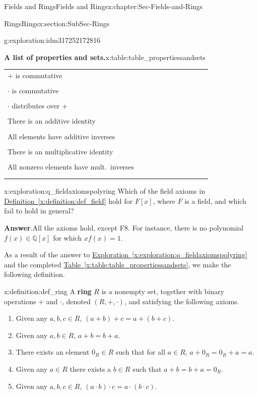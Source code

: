 \documentclass[oneside,10pt,]{book}
\newcommand{\blocktitlefont}{\relax}
\newcommand{\xreffont}{\relax}
\newcommand{\terminology}[1]{\textbf{#1}}
\numberwithin{equation}{section}
\newcommand{\hrulethin}  {\noalign{\hrule height 0.04em}}
\def\Q{{\mathbb Q}}
\begin{document}
\begin{chapterptx}{Fields and Rings}{}{Fields and Rings}{}{}{x:chapter:Sec-Fields-and-Rings}
\begin{sectionptx}{Rings}{}{Rings}{}{}{x:section:SubSec-Rings}
\begin{exploration}{}{g:exploration:idm317252172816}
\begin{tableptx}{\textbf{A list of properties and sets.}}{x:table:table_propertiessandsets}{}
{\begin{tabular}{lllllllllll}
+ is commutative&&&&&&&&&&\tabularnewline[0pt]
&&&&&&&&&&\tabularnewline\hrulethin
\(\cdot\) is commutative&&&&&&&&&&\tabularnewline[0pt]
&&&&&&&&&&\tabularnewline\hrulethin
\(\cdot\) distributes over +&&&&&&&&&&\tabularnewline[0pt]
&&&&&&&&&&\tabularnewline\hrulethin
There is an additive identity&&&&&&&&&&\tabularnewline[0pt]
&&&&&&&&&&\tabularnewline\hrulethin
All elements have additive inverses&&&&&&&&&&\tabularnewline[0pt]
&&&&&&&&&&\tabularnewline\hrulethin
There is an multiplicative identity&&&&&&&&&&\tabularnewline[0pt]
&&&&&&&&&&\tabularnewline\hrulethin
All nonzero elements have mult.~inverses&&&&&&&&&&\tabularnewline[0pt]
&&&&&&&&&&\tabularnewline\hrulethin
\end{tabular}
}%
\end{tableptx}%
\end{exploration}
\begin{exploration}{}{x:exploration:q_fieldaxiomspolyring}%
Which of the field axioms in \hyperref[x:definition:def_field]{Definition~{\xreffont\ref{x:definition:def_field}}} hold for \(F[x]\), where \(F\) is a field, and which fail to hold in general?%
\par\smallskip%
\noindent\textbf{\blocktitlefont Answer}.\hypertarget{g:answer:idm317252120304}{}\quad{}All the axioms hold, except F8. For instance, there is no polynomial \(f(x)\in \Q[x]\) for which \(x f(x) = 1\).%
\end{exploration}
As a result of the answer to \hyperref[x:exploration:q_fieldaxiomspolyring]{Exploration~{\xreffont\ref{x:exploration:q_fieldaxiomspolyring}}} and the completed \hyperref[x:table:table_propertiessandsets]{Table~{\xreffont\ref{x:table:table_propertiessandsets}}}, we make the following definition.%
\begin{definition}{}{x:definition:def_ring}%
%
A \terminology{ring} \(R\) is a nonempty set, together with binary operations \(+\) and \(\cdot\), denoted \((R,+,\cdot)\), and satisfying the following axioms.%
\begin{enumerate}
\item{}Given any \(a,b,c\in R\), \((a+b)+c = a+(b+c)\).%
\item{}Given any \(a,b\in R\), \(a+b= b+a\).%
\item{}There exists an element \(0_R\in R\) such that for all \(a\in R\), \(a+0_R = 0_R + a = a\).%
\item{}Given any \(a\in R\) there exists a \(b\in R\) such that \(a+b = b + a =0_R\).%
\item{}Given any \(a,b,c\in R\), \((a\cdot b)\cdot c = a\cdot (b\cdot c)\).%

\end{enumerate}
\end{definition}
\end{sectionptx}
\end{chapterptx}
\end{document}
